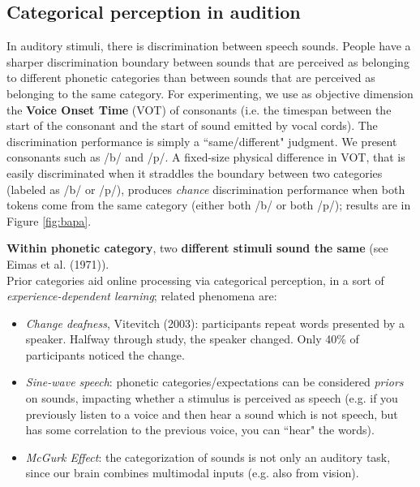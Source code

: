 \subsection{Categorical perception in audition}
In auditory stimuli, there is discrimination between speech sounds. People have a sharper discrimination boundary between sounds that are perceived as belonging to different phonetic categories than between sounds that are perceived as belonging to the same category.
For experimenting, we use as objective dimension the \textbf{Voice Onset Time} (VOT) of consonants (i.e. the timespan between the start of the consonant and the start of sound emitted by vocal cords). The discrimination performance is simply a ``same/different" judgment. We present consonants such as /b/ and /p/. A fixed-size physical difference in VOT, that is easily discriminated when it straddles the boundary between two categories (labeled as /b/ or /p/), produces \textit{chance} discrimination performance when both tokens come from the same category (either both /b/ or both /p/); results are in Figure \ref{fig:bapa}.

\textbf{Within phonetic category}, two \textbf{different stimuli sound the same} (see \notedv Eimas et al. (1971)).\\

Prior categories aid online processing via categorical perception, in a sort of \textit{experience-dependent learning}; related phenomena are:
\begin{itemize}
    \item \textit{Change deafness}, Vitevitch (2003): participants repeat words presented by a speaker. Halfway through study, the speaker changed. Only 40\% of participants noticed the change.
    \item \textit{Sine-wave speech}: phonetic categories/expectations can be considered \textit{priors} on sounds, impacting whether a stimulus is perceived as speech (e.g. if you previously listen to a voice and then hear a sound which is not speech, but has some correlation to the previous voice, you can ``hear" the words).
    \item \textit{McGurk Effect}: the categorization of sounds is not only an auditory task, since our brain combines multimodal inputs (e.g. also from vision).
\end{itemize}

